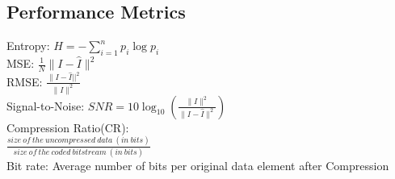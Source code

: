 \subsection*{Performance Metrics}
Entropy: $H=-\sum_{i=1}^{n}p_i\log p_i$\\
MSE: $\frac{1}{N}\|I-\hat{I}\|^2$\\
RMSE: $\frac{\|I-\hat{I}||^2}{\|I\|^2}$\\
Signal-to-Noise: $SNR=10\log_{10}(\frac{\|I\|^2}{\|I-\hat{I}\|^2})$\\
Compression Ratio(CR):\\
$\frac{size\ of\ the\ uncompressed\ data\ (in\ bits)}{size\ of\ the\ coded\ bitstream\ (in\ bits)}$\\
Bit rate: {\color{myblue}Average number of bits per original data element after Compression}\\

